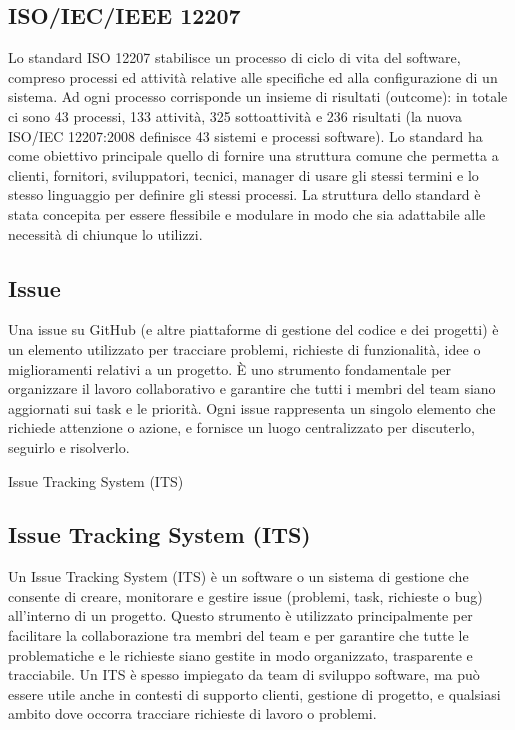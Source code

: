 \hypertarget{ISO/IEC/IEEE 12207}{}
\subsection*{ISO/IEC/IEEE 12207}
Lo standard ISO 12207 stabilisce un processo di ciclo di vita del software, compreso processi ed attività relative alle specifiche ed alla configurazione di un sistema.
Ad ogni processo corrisponde un insieme di risultati (outcome): in totale ci sono 43 processi, 133 attività, 325 sottoattività e 236 risultati (la nuova ISO/IEC 12207:2008 definisce 43 sistemi e processi software).
Lo standard ha come obiettivo principale quello di fornire una struttura comune che permetta a clienti, fornitori, sviluppatori, tecnici, manager di usare gli stessi termini e lo stesso linguaggio per definire gli stessi processi.
La struttura dello standard è stata concepita per essere flessibile e modulare in modo che sia adattabile alle necessità di chiunque lo utilizzi.

\subsection*{Issue}
Una issue su GitHub (e altre piattaforme di gestione del codice e dei progetti) è un elemento utilizzato per tracciare problemi, richieste di funzionalità, 
idee o miglioramenti relativi a un progetto. È uno strumento fondamentale per organizzare il lavoro collaborativo e garantire che tutti i membri del team 
siano aggiornati sui task e le priorità. Ogni issue rappresenta un singolo elemento che richiede attenzione o azione, e fornisce un luogo centralizzato per 
discuterlo, seguirlo e risolverlo.

\hypertarget{sec:issue_tracking_system}{Issue Tracking System (ITS)}
\subsection*{Issue Tracking System (ITS)}
Un Issue Tracking System (ITS) è un software o un sistema di gestione che consente di creare, monitorare e gestire issue 
(problemi, task, richieste o bug) all'interno di un progetto. Questo strumento è utilizzato principalmente per facilitare la collaborazione 
tra membri del team e per garantire che tutte le problematiche e le richieste siano gestite in modo organizzato, trasparente e tracciabile. 
Un ITS è spesso impiegato da team di sviluppo software, ma può essere utile anche in contesti di supporto clienti, gestione di progetto, e 
qualsiasi ambito dove occorra tracciare richieste di lavoro o problemi.

\newpage